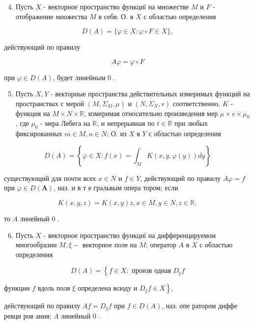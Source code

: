 \documentclass[10pt]{article}
\begin{document}
\begin{enumerate}
  \setcounter{enumi}{3}
  \item Пусть $X$ - векторное пространство функциї на множестве $M$ и $F$ - отображение множества $M$ в себя; О. в $X$ с областью определения
\end{enumerate}

\[
D(A)=\{\varphi \in X: \varphi \circ F \in X\},
\]

действующий по правилу

\[
A \varphi=\varphi \circ F
\]

при $\varphi \in D(A)$, будет линейным 0 .

\begin{enumerate}
  \setcounter{enumi}{4}
  \item Пусть $X, Y$ - векторные пространства действительных измеримых функций на пространствах с мерой $\left(M, \Sigma_{M}, \mu\right)$ и $\left(N, \Sigma_{N}, v\right)$ соответственно, $K$ - функция на $M \times N \times \mathbb{R}$, измеримая относительно произведения мер $\mu \times v \times \mu_{0}$, где $\mu_{0}$ - мера Лебега на $\mathbb{R}$, и непрерывная по $t \in \mathbb{R}$ при любых фиксированных $m \in M, n \in N$; О. из $X$ в $Y$ с областью определения
\end{enumerate}

\[
D(A)=\left\{\varphi \in X: f(x)=\int_{M} K(x, y, \varphi(y)) d y\right\}
\]

существующий для почти всех $x \in N$ и $f \in Y$, действующий по правилу $A \varphi=f$ при $\varphi \in D(\boldsymbol{A})$, наз. и в т е гральвым опера тором; если

\[
K(x, y, z)=K(x, y) z, x \in M, y \in N, z \in \mathbb{R},
\]

то $A$ линейный 0 .

\begin{enumerate}
  \setcounter{enumi}{5}
  \item Пусть $X$ - векторное пространство функциї на дифференцируемом многообразии $M, \xi-$ векторное поле на $M$; оператор $A$ в $X$ с областью определения
\end{enumerate}

\[
D(A)=\left\{f \in X: \text { произв одная } D_{\xi} f\right.
\]

функции $f$ вдоль поля $\xi$ определена всюду и $\left.D_{\xi} f \in X\right\}$,

действующий по правилу $A f=D_{\xi} f$ при $f \in D(A)$, наз. опе ратором диффе ревци ров ания; $A$ линейный 0 .
\end{document}
